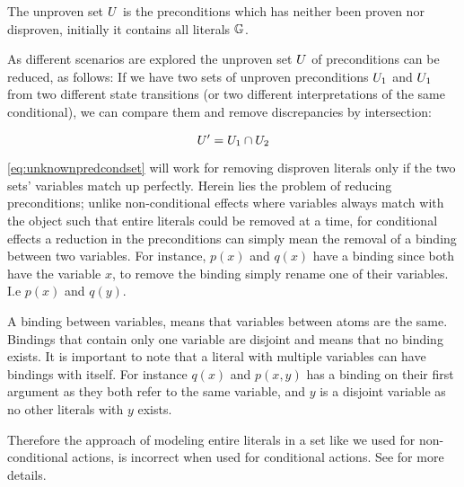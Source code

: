 \documentclass[\master/Master.tex]{subfiles}
\begin{document}
\begin{definition}
The unproven set $U$ is the preconditions which has neither been proven nor disproven, initially it contains all  literals $\mathbb{G}$.
\end{definition}


As different scenarios are explored the unproven set $U$ of preconditions can be reduced, as follows:
If we have two sets of unproven preconditions $U_1$ and $U_1$ from two different state transitions (or two different interpretations of the same conditional), we can compare them and remove discrepancies by intersection:

\begin{equation}
\label{eq:unknownpredcondset}
	U' = U_1 \cap U_2
\end{equation}

\eqref{eq:unknownpredcondset} will work for removing  disproven literals only if the two sets' variables match up perfectly. Herein lies the problem of reducing preconditions; unlike non-conditional effects where variables always match with the object such that entire literals could be removed at a time, for conditional effects a reduction in the preconditions can simply mean the removal of a binding between two variables. For instance, $p(x)$ and $q(x)$ have a binding since both have the variable $x$, to remove the binding simply rename one of their variables. I.e $p(x)$ and $q(y)$.

\begin{definition}[Binding]\label{def:ca:binding}
    A binding between variables, means that variables between atoms are the same.
	Bindings that contain only one variable are disjoint and means that no binding exists.
	It is important to note that a literal with multiple variables can have bindings with itself.
	For instance $q(x)$ and $p(x,y)$ has a binding on their first argument as they both refer to the same variable, and $y$ is a disjoint variable as no other literals with $y$ exists.
\end{definition}
Therefore the approach of modeling entire literals in a set like we used for non-conditional actions, is incorrect when used for conditional actions. See  for more details.
\end{document}

